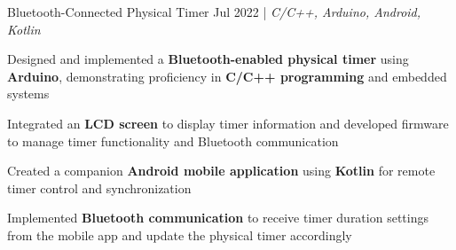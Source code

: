 \resumeSubheadings
{Bluetooth-Connected Physical Timer }{Jul 2022}
{}{}{| \textit{C/C++, Arduino, Android, Kotlin}}
\resumeItemListStart
\item Designed and implemented a \textbf{Bluetooth-enabled physical timer} using \textbf{Arduino}, demonstrating proficiency in \textbf{C/C++ programming} and embedded systems
\item Integrated an \textbf{LCD screen} to display timer information and developed firmware to manage timer functionality and Bluetooth communication
\item Created a companion \textbf{Android mobile application} using \textbf{Kotlin} for remote timer control and synchronization
\item Implemented \textbf{Bluetooth communication} to receive timer duration settings from the mobile app and update the physical timer accordingly
\resumeItemListEnd